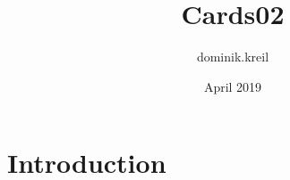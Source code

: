 \documentclass{article}
\title{Cards02}
\author{dominik.kreil }
\date{April 2019}
\begin{document}
\maketitle

\section{Introduction}
\end{document}
